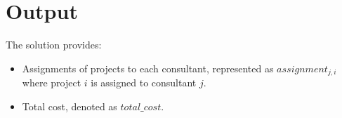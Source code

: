 \documentclass{article}
\begin{document}
\section*{Output}

The solution provides:
\begin{itemize}
    \item Assignments of projects to each consultant, represented as $assignment_{j,i}$ where project $i$ is assigned to consultant $j$.
    \item Total cost, denoted as $total\_cost$.
\end{itemize}
\end{document}
